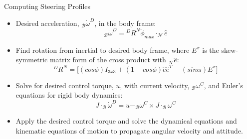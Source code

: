\documentclass{beamer}
\begin{document}
\begin{frame}{Computing Steering Profiles}

\begin{block}{ }
	\begin{itemize}
	\item Desired acceleration, $_\mathcal{B}\dot{\omega}^{D}$, in the body frame: 
	\begin{equation}
	_\mathcal{B}\dot{\omega}^{D} = {}^DR^N \ddot{\phi}_{max} \cdot _\mathcal{N}\hat{e}
	\end{equation}
	\item Find rotation from inertial to desired body frame, where $E^x$ is the skew-symmetric matrix form of the cross product with $_\mathcal{N}\hat{e}$: 
	\begin{equation}
	{}^DR^N = \big[(cos\phi)I_{3x3} + (1 - cos\phi)\hat{e}\hat{e}^T - (sin\alpha)E^x \big]
	\end{equation}
	
%
%
	\item Solve for desired control torque, $u$, with current velocity, $_\mathcal{B}\omega^C$, and Euler's equations for rigid body dynamics: 
	\begin{equation}
	J \cdot _\mathcal{B}\dot{\omega}^D = u - _\mathcal{B}\omega^C \times J \cdot _\mathcal{B}\omega^C 
	\end{equation}
	\item Apply the desired control torque and solve the dynamical equations and kinematic equations of motion to propagate angular velocity and attitude. 
\end{itemize}
\end{block}

\end{frame}
\end{document}

